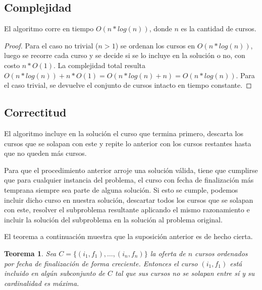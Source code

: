 \documentclass[a4paper, 10pt, twoside]{article}
\begin{document}
\subsection{Complejidad}

El algoritmo corre en tiempo $O(n*log(n))$, donde $n$ es la cantidad de cursos.

\begin{proof}
    Para el caso no trivial ($n > 1$) se ordenan los cursos en $O(n * log(n))$, luego se recorre cada curso y se decide si se lo incluye en la solución o no, con costo $n * O(1)$. La complejidad total resulta $O(n * log(n)) + n * O(1) = O(n * log(n) + n) = O(n * log(n))$. Para el caso trivial, se devuelve el conjunto de cursos intacto en tiempo constante.
\end{proof}


\subsection{Correctitud}

El algoritmo incluye en la solución el curso que termina primero, descarta los cursos que se solapan con este y repite lo anterior con los cursos restantes hasta que no queden más cursos.

Para que el procedimiento anterior arroje una solución válida, tiene que cumplirse que para cualquier instancia del problema, el curso con fecha de finalización más temprana siempre sea parte de alguna solución. Si esto se cumple, podemos incluir dicho curso en nuestra solución, descartar todos los cursos que se solapan con este, resolver el subproblema resultante aplicando el mismo razonamiento e incluir la solución del subproblema en la solución al problema original.

El teorema a continuación muestra que la suposición anterior es de hecho cierta.

\newtheorem*{teorema-ej2}{Teorema}

\begin{teorema-ej2}
    Sea $C = \{ (i_1, f_1), \ldots, (i_n, f_n) \}$ la oferta de $n$ cursos ordenados por fecha de finalización de forma creciente. Entonces el curso $(i_1, f_1)$ está incluido en algún subconjunto de $C$ tal que sus cursos no se solapan entre sí y su cardinalidad es máxima.
\end{teorema-ej2}
\end{document}
